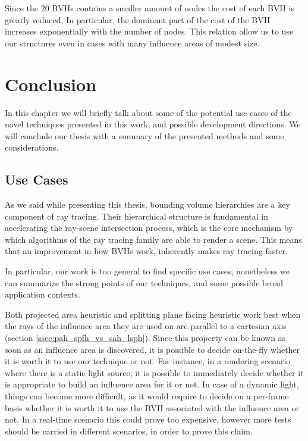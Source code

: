 \documentclass{PoliMi_MasterThesis}
\begin{document}
Since the $20$ BVHs contains a smaller amount of nodes the cost of each BVH is greatly reduced. In particular, the dominant part of the cost of the BVH increases exponentially with the number of nodes. This relation allow us to use our structures even in cases with many influence areas of modest size.

\chapter{Conclusion} \label{ch:conclusion}
In this chapter we will briefly talk about some of the potential use cases of the novel techniques presented in this work, and possible development directions. We will conclude our thesis with a summary of the presented methods and some considerations.

\section{Use Cases} \label{sec:use_cases}
As we said while presenting this thesis, bounding volume hierarchies are a key component of ray tracing. Their hierarchical structure is fundamental in accelerating the ray-scene intersection process, which is the core mechanism by which algorithms of the ray tracing family are able to render a scene. This means that an improvement in how BVHs work, inherently makes ray tracing faster.

In particular, our work is too general to find specific use cases, nonetheless we can summarize the strong points of our techniques, and some possible broad application contexts.

Both projected area heuristic and splitting plane facing heuristic work best when the rays of the influence area they are used on are parallel to a cartesian axis (section \ref{ssec:pah_spfh_vs_sah_lsph}). Since this property can be known as soon as an influence area is discovered, it is possible to decide on-the-fly whether it is worth it to use our technique or not. For instance, in a rendering scenario where there is a static light source, it is possible to immediately decide whether it is appropriate to build an influence area for it or not. In case of a dynamic light, things can become more difficult, as it would require to decide on a per-frame basis whether it is worth it to use the BVH associated with the influence area or not. In a real-time scenario this could prove too expensive, however more tests should be carried in different scenarios, in order to prove this claim.
\end{document}
